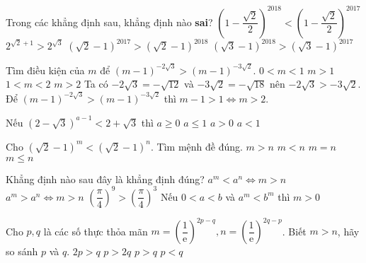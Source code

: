 \begin{ex}%
	Trong các khẳng định sau, khẳng định nào \textbf{sai}?
	\choice
	{$\left(1 - \dfrac{\sqrt{2}}{2}\right)^{2018}<\left(1 - \dfrac{\sqrt{2}}{2}\right)^{2017}$}
	{$2^{\sqrt{2}+ 1}>2^{\sqrt{3}}$}
	{$\left(\sqrt{2}-1\right)^{2017}>\left(\sqrt{2}-1\right)^{2018}$}
	{\True $\left(\sqrt{3}-1\right)^{2018}>\left(\sqrt{3}-1\right)^{2017}$}
\end{ex}
\begin{ex}%
	Tìm điều kiện của $m$ để $(m-1)^{-2\sqrt{3}}>(m-1)^{-3\sqrt{2}}$.
	\choice
	{$0<m<1$}
	{$m>1$}
	{$1<m<2$}
	{\True $m>2$}
	\loigiai
	{Ta có $-2\sqrt{3} = -\sqrt{12}$ và $-3\sqrt{2} = -\sqrt{18}$ nên $-2\sqrt{3} > -3\sqrt{2}$.\\
		Để $(m-1)^{-2\sqrt{3}}>(m-1)^{-3\sqrt{2}}$ thì $m-1>1 \Leftrightarrow m>2$.
	}
\end{ex}
\begin{ex}%
	Nếu $\left( 2-\sqrt{3} \right)^{a-1}<2+\sqrt{3}$ thì
	\choice
	{$a\ge 0$}
	{$a\le 1$}
	{\True $a>0$}
	{$a<1$}
\end{ex}
\begin{ex}%
	Cho $\left(\sqrt{2}-1\right)^m<\left(\sqrt{2}-1\right)^n$. Tìm mệnh đề đúng.
	\choice
	{\True $m>n$}
	{$m<n$}
	{$m=n$}
	{$m\leq n$}
	
\end{ex}
\begin{ex}%
	Khẳng định nào sau đây là khẳng định đúng?
	\choice
	{$a^m < a^n \Leftrightarrow m > n$}
	{$a^m > a^n \Leftrightarrow m > n$}
	{$\left(\dfrac{\pi}{4}\right)^9 > \left(\dfrac{\pi}{4}\right)^3$}
	{\True Nếu $0 < a < b$ và $a^m < b^m$ thì $m > 0$}
	
\end{ex}
\begin{ex}%
	Cho $ p, q $ là các số thực thỏa mãn $ m=\left(\dfrac{1}{\mathrm{e}}\right)^{2p-q}, n=\left(\dfrac{1}{\mathrm{e}}\right)^{2q-p} $. Biết $ m>n $, hãy so sánh $ p $ và $ q $.
	\choice
	{$ 2p>q $}
	{$ p>2q $}
	{$ p>q $}
	{\True $ p<q $}
	
\end{ex}
